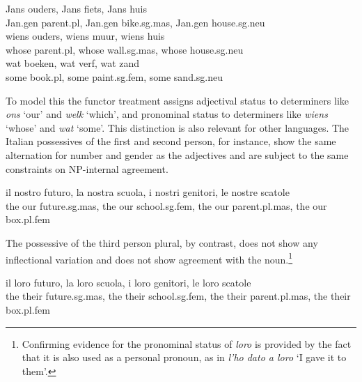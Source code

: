 \documentclass[output=paper]{langsci/langscibook}
\begin{document}
\begin{exe} 
\ex\label{jans}
\gll  Jans ouders,                   Jans fiets,                      Jans huis \\ 
      Jan.{\sc gen} parent.{\sc pl}, Jan.{\sc gen} bike.{\sc sg.mas}, Jan.{\sc gen} house.{\sc sg.neu} \\
\ex\label{wiens}
\gll  wiens ouders,          wiens muur,              wiens huis \\ 
      whose parent.{\sc pl}, whose wall.{\sc sg.mas}, whose house.{\sc sg.neu} \\
\ex\label{wat}
\gll  wat boeken,         wat verf,                wat zand  \\
      some book.{\sc pl}, some paint.{\sc sg.fem}, some sand.{\sc sg.neu} \\
\end{exe} 

\noindent
To model this the functor treatment assigns adjectival status 
to determiners like {\it ons\/} `our' and {\it welk\/} `which', 
and pronominal status to determiners like {\it wiens\/} `whose' and
{\it wat\/} `some'.  
This distinction is also relevant for other languages. The Italian 
possessives of the first and second person, for instance, 
show the same alternation for number and gender as the adjectives
and are subject to the same constraints on NP-internal agreement.

\begin{exe}  
\ex 
\gll  il nostro futuro, la nostra scuola, i nostri genitori, le nostre scatole \\
      the our future.{\sc sg.mas}, the our school.{\sc sg.fem}, the our parent.{\sc pl.mas}, the our box.{\sc pl.fem} \\ 
\end{exe} 

\noindent
The possessive of the third person plural, by contrast, does not show any 
inflectional variation and does not show agreement with the 
noun.\footnote{Confirming evidence for the pronominal status of {\it loro\/} is 
provided by the fact that it is also used as a personal pronoun, as in 
{\it l'ho dato a loro\/} `I gave it to them'.}

\begin{exe} 
\ex 
\gll  il loro futuro, la loro scuola, i loro genitori, le loro scatole \\   
      the their future.{\sc sg.mas}, the their school.{\sc sg.fem}, the their parent.{\sc pl.mas}, the their box.{\sc pl.fem} \\ 
\end{exe}
\end{document}
